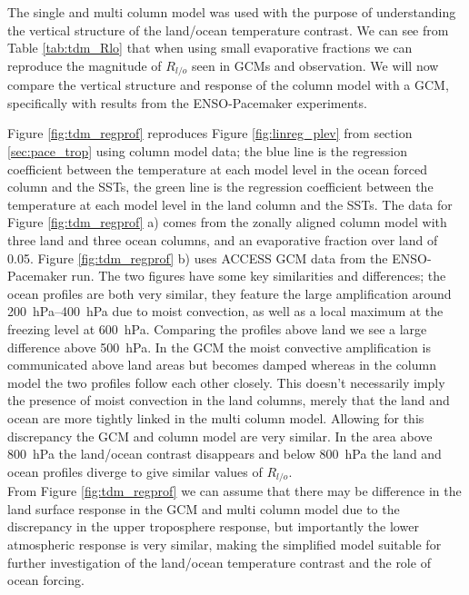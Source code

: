 The single and multi column model was used with the purpose of understanding the 
vertical structure of the land/ocean temperature contrast. We can see from Table 
\ref{tab:tdm_Rlo} that when using small evaporative fractions we can reproduce 
the magnitude of $R_{l/o}$ seen in GCMs and observation. We will now compare the 
vertical structure and response of the column model with a GCM, specifically 
with results from the ENSO-Pacemaker experiments.  

Figure \ref{fig:tdm_regprof} reproduces Figure \ref{fig:linreg_plev} from 
section \ref{sec:pace_trop} using column model data; the blue line is the 
regression coefficient between the temperature at each model level in the ocean 
forced column and the SSTs, the green line is the regression coefficient between 
the temperature at each model level in the land column and the SSTs. The data 
for Figure \ref{fig:tdm_regprof} a) comes from the zonally aligned column model 
with three land and three ocean columns, and an evaporative fraction over land 
of 0.05.  Figure \ref{fig:tdm_regprof} b) uses ACCESS GCM data from the 
ENSO-Pacemaker run. The two figures have some key similarities and differences; 
the ocean profiles are both very similar, they feature the large amplification 
around \SIrange{200}{400}{\hecto\pascal} due to moist convection, as well as a 
local maximum at the freezing level at \SI{600}{\hecto\pascal}.  Comparing the 
profiles above land we see a large difference above \SI{500}{\hecto\pascal}. In 
the GCM the moist convective amplification is communicated above land areas but 
becomes damped whereas in the column model the two profiles follow each other 
closely.  This doesn't necessarily imply the presence of moist convection in the 
land columns, merely that the land and ocean are more tightly linked in the 
multi column model.  Allowing for this discrepancy the GCM and column model are 
very similar.  In the area above \SI{800}{\hecto\pascal} the land/ocean contrast 
disappears and below \SI{800}{\hecto\pascal} the land and ocean profiles diverge 
to give similar values of $R_{l/o}$.\\
From Figure \ref{fig:tdm_regprof} we can assume that there may be difference in 
the land surface response in the GCM and multi column model due to the 
discrepancy in the upper troposphere response, but importantly the lower 
atmospheric response is very similar, making the simplified model suitable for 
further investigation of the land/ocean temperature contrast and the role of 
ocean forcing.


